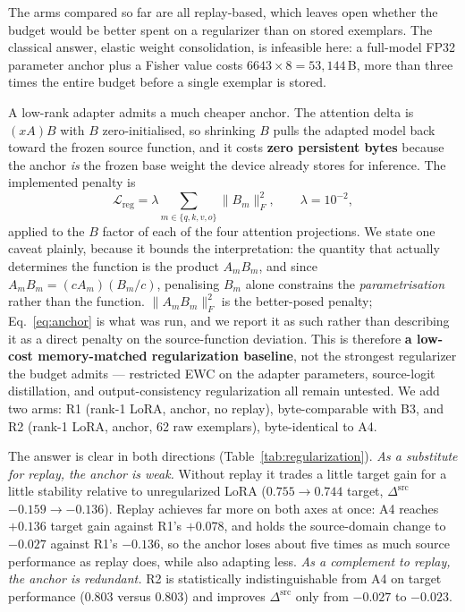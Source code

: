 The arms compared so far are all replay-based, which leaves open whether the
budget would be better spent on a regularizer than on stored exemplars. The
classical answer, elastic weight consolidation, is infeasible here: a full-model
FP32 parameter anchor plus a Fisher value costs $6643 \times 8 = 53{,}144$\,B,
more than three times the entire budget before a single exemplar is stored.

A low-rank adapter admits a much cheaper anchor. The attention delta is $(xA)B$
with $B$ zero-initialised, so shrinking $B$ pulls the adapted model back toward
the frozen source function, and it costs \textbf{zero persistent bytes} because
the anchor \emph{is} the frozen base weight the device already stores for
inference. The implemented penalty is
\begin{equation}
\mathcal{L}_{\mathrm{reg}} = \lambda \sum_{m \in \{q,k,v,o\}} \|B_m\|_F^2,
\qquad \lambda = 10^{-2},
\label{eq:anchor}
\end{equation}
applied to the $B$ factor of each of the four attention projections. We state one
caveat plainly, because it bounds the interpretation: the quantity that actually
determines the function is the product $A_mB_m$, and since
$A_mB_m = (cA_m)(B_m/c)$, penalising $B_m$ alone constrains the
\emph{parametrisation} rather than the function. $\|A_mB_m\|_F^2$ is the
better-posed penalty; Eq.~\eqref{eq:anchor} is what was run, and we report it as
such rather than describing it as a direct penalty on the source-function
deviation. This is therefore \textbf{a low-cost memory-matched regularization
baseline}, not the strongest regularizer the budget admits --- restricted EWC on
the adapter parameters, source-logit distillation, and output-consistency
regularization all remain untested. We add two arms: R1 (rank-1 LoRA, anchor, no
replay), byte-comparable with B3, and R2 (rank-1 LoRA, anchor, 62 raw exemplars),
byte-identical to A4.

The answer is clear in both directions (Table~\ref{tab:regularization}).
\emph{As a substitute for replay, the anchor is weak.} Without replay it trades a
little target gain for a little stability relative to unregularized LoRA
($0.755 \to 0.744$ target, $\Delta^{\mathrm{src}}$ $-0.159 \to -0.136$). Replay achieves far
more on both axes at once: A4 reaches $+0.136$ target gain against R1's $+0.078$,
and holds the source-domain change to $-0.027$ against R1's $-0.136$, so the anchor loses
about five times as much source performance as replay does, while also adapting
less. \emph{As a
complement to replay, the anchor is redundant.} R2 is statistically
indistinguishable from A4 on target performance ($0.803$ versus $0.803$) and
improves $\Delta^{\mathrm{src}}$ only from $-0.027$ to $-0.023$.

